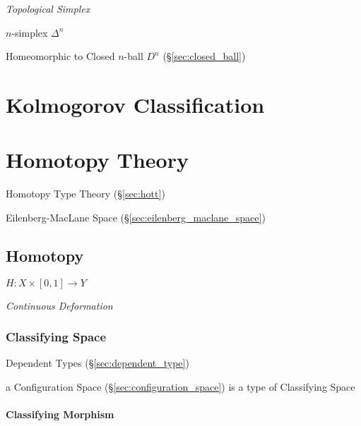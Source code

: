 \emph{Topological Simplex}

$n$-simplex $\Delta^n$

Homeomorphic to Closed $n$-ball $D^n$ (\S\ref{sec:closed_ball})



\section{Kolmogorov Classification}\label{sec:kolmogorov_classification}

\section{Homotopy Theory}\label{sec:homotopy_theory}

Homotopy Type Theory (\S\ref{sec:hott})

Eilenberg-MacLane Space (\S\ref{sec:eilenberg_maclane_space})



\subsection{Homotopy}\label{sec:homotopy}

$H : X \times [0,1] \rightarrow Y$

\emph{Continuous Deformation}



\subsubsection{Classifying Space}\label{sec:classifying_space}

Dependent Types (\S\ref{sec:dependent_type})

a Configuration Space (\S\ref{sec:configuration_space}) is a type of
Classifying Space



\paragraph{Classifying Morphism}\label{sec:classifying_morphism}\hfill

